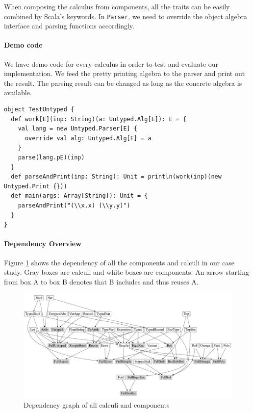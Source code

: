 When composing the calculus from components, all the traits can be
easily combined by Scala's  keywords.
In \lstinline{Parser}, we need to override the object algebra interface and
parsing functions accordingly.

\paragraph{Demo code}
We have demo code for every calculus in order to test and evaluate our implementation.
We feed the pretty printing algebra to the parser and print out the result.
The parsing result can be changed as long as the concrete algebra is available.

\begin{lstlisting}
object TestUntyped {
  def work[E](inp: String)(a: Untyped.Alg[E]): E = {
    val lang = new Untyped.Parser[E] {
      override val alg: Untyped.Alg[E] = a
    }
    parse(lang.pE)(inp)
  }
  def parseAndPrint(inp: String): Unit = println(work(inp)(new Untyped.Print {}))
  def main(args: Array[String]): Unit = {
    parseAndPrint("(\\x.x) (\\y.y)")
  }
}
\end{lstlisting}

\paragraph{Dependency Overview}
Figure \ref{fig:dependency} shows the
dependency of all the components and calculi in our case study. Gray
boxes are calculi and white boxes are components. An arrow starting
from box A to box B denotes that B includes and thus reuses A.

\begin{figure}
    \centering
    \includegraphics[width=\textwidth]{resources/depGraph.pdf}
    \caption{Dependency graph of all calculi and components}
    \label{fig:dependency}
\end{figure}

